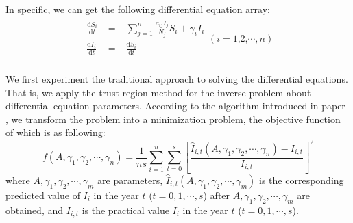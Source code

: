 In specific, we can get the following differential equation array:
\begin{eqnarray}
\begin{aligned}\label{arrayy_diff}
	\frac{\text{d}S_i}{\text{d}t}&=-\sum_{j=1}^n{\frac{a_{ij}I_j}{N_j}S_i}+\gamma _iI_i\\
	\frac{\text{d}I_i}{\text{d}t}&=-\frac{\text{d}S_i}{\text{d}t}\\
\end{aligned}\left( i=\text{1,2,}\cdots ,n \right)
\end{eqnarray}




We first experiment the traditional approach to solving the differential equations. That is, we apply the trust region method \cite{7} for the inverse problem about differential equation parameters. According to the algorithm introduced in paper \cite{7}, we transform the problem into a minimization problem, the objective function of which is as following:
\begin{equation}\label{objective}
f\left( A,\gamma _1,\gamma _2,\cdots ,\gamma _n \right) =\frac{1}{ns}\sum_{i=1}^n{\sum_{t=0}^s\left[\frac{\widehat{I}_{i,t}\left( A,\gamma _1,\gamma _2,\cdots ,\gamma _n \right) -I_{i,t}}{I_{i,t}}\right]^2}
\end{equation}
where $A,\gamma_1, \gamma_2,\cdots , \gamma_m$ are parameters, $\widehat{I}_{i,t}\left( A,\gamma _1,\gamma _2,\cdots ,\gamma _m \right) $ is the corresponding predicted value of $I_i$ in the year $t$ ($t=0,1,\cdots,s$) after $A, \gamma_1, \gamma_2, \cdots , \gamma_m$ are obtained, and $I_{i,t} $ is the practical value $I_i$ in the year $t$ ($t=0,1,\cdots,s$).

